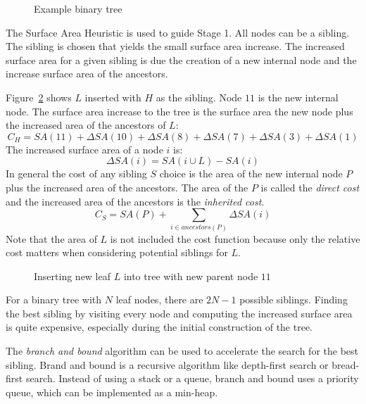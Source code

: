 \documentclass{article}
\begin{document}
\begin{figure}
	\begin{center}
		
	\end{center}
	\caption{Example binary tree}
	\label{fig:example_tree}
\end{figure}

The Surface Area Heuristic is used to guide Stage 1. All nodes can be a sibling. The sibling is chosen that yields the small surface area increase. The increased surface area for a given sibling is due the creation of a new internal node and the increase surface area of the ancestors.

Figure~\ref{fig:insert_leaf} shows $L$ inserted with $H$ as the sibling. Node $11$ is the new internal node. The surface area increase to the tree is the surface area the new node plus the increased area of the ancestors of $L$:
\begin{equation}
	C_H = SA(11) + \Delta SA(10) + \Delta SA(8) + \Delta SA(7) + \Delta SA(3) + \Delta SA(1)
\end{equation}
The increased surface area of a node $i$ is:
\begin{equation}
	\Delta SA(i) = SA(i \cup L) - SA(i)
\end{equation}
In general the cost of any sibling $S$ choice is the area of the new internal node $P$ plus the increased area of the ancestors. The area of the $P$ is called the \emph{direct cost} and the increased area of the ancestors is the \emph{inherited cost}.
\[ C_S = SA(P) + \sum_{i \in ancestors(P)} \Delta SA(i) \]
Note that the area of $L$ is not included the cost function because only the relative cost matters when considering potential siblings for $L$.

\begin{figure}
	\begin{center}
		
	\end{center}
	\caption{Inserting new leaf $L$ into tree with new parent node $11$}
	\label{fig:insert_leaf}
\end{figure}

For a binary tree with $N$ leaf nodes, there are $2N - 1$ possible siblings. Finding the best sibling by visiting every node and computing the increased surface area is quite expensive, especially during the initial construction of the tree.

The \emph{branch and bound} algorithm can be used to accelerate the search for the best sibling. Brand and bound is a recursive algorithm like depth-first search or bread-first search. Instead of using a stack or a queue, branch and bound uses a priority queue, which can be implemented as a min-heap.
\end{document}
